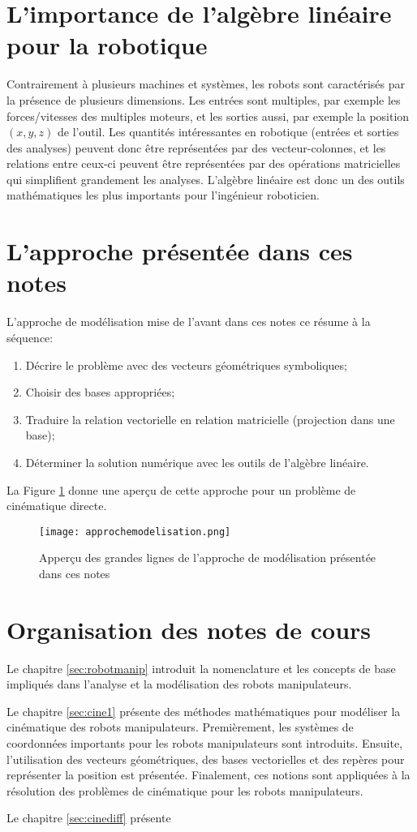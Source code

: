 \section{L'importance de l'algèbre linéaire pour la robotique}

Contrairement à plusieurs machines et systèmes, les robots sont caractérisés par la présence de plusieurs dimensions. Les entrées sont multiples, par exemple les forces/vitesses des multiples moteurs, et les sorties aussi, par exemple la position $(x,y,z)$ de l'outil. Les quantités intéressantes en robotique (entrées et sorties des analyses) peuvent donc être représentées par des vecteur-colonnes, et les relations entre ceux-ci peuvent être représentées par des opérations matricielles qui simplifient grandement les analyses. L'algèbre linéaire est donc un des outils mathématiques les plus importants pour l'ingénieur roboticien. 


\newpage
\section{L'approche présentée dans ces notes}

L'approche de modélisation mise de l'avant dans ces notes ce résume à la séquence:
\begin{enumerate}
	\item Décrire le problème avec des vecteurs géométriques symboliques;
	\item Choisir des bases appropriées;
	\item Traduire la relation vectorielle en relation matricielle (projection dans une base);
	\item Déterminer la solution numérique avec les outils de l'algèbre linéaire.
\end{enumerate}

La Figure \ref{fig:approchemodelisation} donne une aperçu de cette approche pour un problème de cinématique directe.

\begin{figure}
	\centering
		\texttt{[image: approchemodelisation.png]}
	\caption{Apperçu des grandes lignes de l'approche de modélisation présentée dans ces notes}
	\label{fig:approchemodelisation}
\end{figure}


\section{Organisation des notes de cours}

Le chapitre \ref{sec:robotmanip} introduit la nomenclature et les concepts de base impliqués dans l'analyse et la modélisation des robots manipulateurs. 

Le chapitre \ref{sec:cine1} présente des méthodes mathématiques pour modéliser la cinématique des robots manipulateurs. Premièrement, les systèmes de coordonnées importants pour les robots manipulateurs sont introduits. Ensuite, l'utilisation des vecteurs géométriques, des bases vectorielles et des repères pour représenter la position est présentée. Finalement, ces notions sont appliquées à la résolution des problèmes de cinématique pour les robots manipulateurs. 

Le chapitre \ref{sec:cinediff} présente